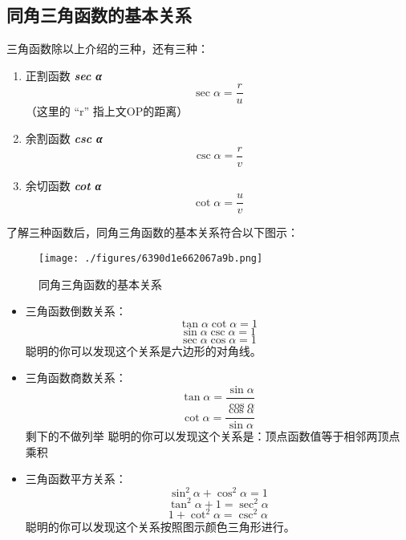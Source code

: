\subsection{同角三角函数的基本关系}
三角函数除以上介绍的三种，还有三种：
\begin{enumerate}
\item 正割函数 \textbf{\textsl{sec α}} 
\begin{equation}
\sec \alpha = \frac{r}{u}
\end{equation}
（这里的 “r” 指上文OP的距离）
\item 余割函数 \textbf{\textsl{csc α}} 
\begin{equation}
\csc \alpha = \frac{r}{v}
\end{equation}
\item 余切函数 \textbf{\textsl{cot α}} 
\begin{equation}
\cot \alpha = \frac{u}{v}
\end{equation}
\end{enumerate}
了解三种函数后，同角三角函数的基本关系符合以下图示：
\begin{figure}[ht]
\centering
\texttt{[image: ./figures/6390d1e662067a9b.png]}
\caption{同角三角函数的基本关系} \label{fig_HsTrFu_4}
\end{figure}
\begin{itemize}
\item 三角函数倒数关系：
\begin{equation}
\tan \alpha  \cot \alpha = 1
\end{equation}
\begin{equation}
\sin \alpha  \csc \alpha = 1
\end{equation}
\begin{equation}
\sec \alpha  \cos \alpha = 1
\end{equation}
聪明的你可以发现这个关系是六边形的对角线。
\item 三角函数商数关系：
\begin{equation}
\tan \alpha = \frac{\sin \alpha}{\cos \alpha}
\end{equation}
\begin{equation}
\cot \alpha = \frac{\cos \alpha}{\sin \alpha}
\end{equation}
剩下的不做列举
聪明的你可以发现这个关系是：顶点函数值等于相邻两顶点乘积
\item 三角函数平方关系：
\begin{equation}
\sin ^{2} \alpha + \cos ^{2}\alpha =1
\end{equation}
\begin{equation}
\tan  ^{2} \alpha + 1 =\sec ^{2}\alpha
\end{equation}
\begin{equation}
1 + \cot ^{2}\alpha =\csc ^{2}\alpha
\end{equation}
聪明的你可以发现这个关系按照图示颜色三角形进行。
\end{itemize}
